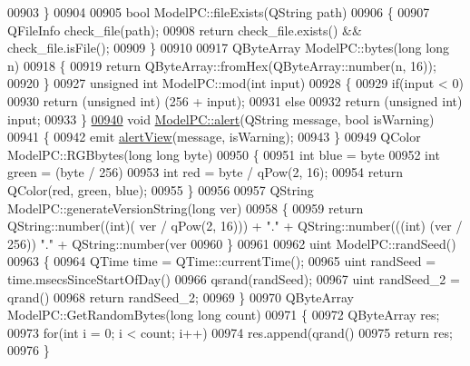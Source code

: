 \begin{DoxyCode}
{00903 \}
00904 
00905 \textcolor{keywordtype}{bool} ModelPC::fileExists(QString path)
00906 \{
00907     QFileInfo check\_file(path);
00908     \textcolor{keywordflow}{return} check\_file.exists() && check\_file.isFile();
00909 \}
00910 
00917 QByteArray ModelPC::bytes(\textcolor{keywordtype}{long} \textcolor{keywordtype}{long} n)
00918 \{
00919     \textcolor{keywordflow}{return} QByteArray::fromHex(QByteArray::number(n, 16));
00920 \}
00927 \textcolor{keywordtype}{unsigned} \textcolor{keywordtype}{int} ModelPC::mod(\textcolor{keywordtype}{int} input)
00928 \{
00929     \textcolor{keywordflow}{if}(input < 0)
00930         \textcolor{keywordflow}{return} (\textcolor{keywordtype}{unsigned} \textcolor{keywordtype}{int}) (256 + input);
00931     \textcolor{keywordflow}{else}
00932         \textcolor{keywordflow}{return} (\textcolor{keywordtype}{unsigned} \textcolor{keywordtype}{int}) input;
00933 \}
\hypertarget{modelpc_8cpp_source.tex_l00940}{}\hyperlink{class_model_p_c_a9079a101d83672aa48fd2dbac797de40}{00940} \textcolor{keywordtype}{void} \hyperlink{class_model_p_c_a9079a101d83672aa48fd2dbac797de40}{ModelPC::alert}(QString message, \textcolor{keywordtype}{bool} isWarning)
00941 \{
00942     emit \hyperlink{class_model_p_c_af0217a7ca5671e26090dc50a5dccdaf5}{alertView}(message, isWarning);
00943 \}
00949 QColor ModelPC::RGBbytes(\textcolor{keywordtype}{long} \textcolor{keywordtype}{long} byte)
00950 \{
00951     \textcolor{keywordtype}{int} blue = byte %
00952     \textcolor{keywordtype}{int} green = (byte / 256) %
00953     \textcolor{keywordtype}{int} red = byte / qPow(2, 16);
00954     \textcolor{keywordflow}{return} QColor(red, green, blue);
00955 \}
00956 
00957 QString ModelPC::generateVersionString(\textcolor{keywordtype}{long} ver)
00958 \{
00959     \textcolor{keywordflow}{return} QString::number((\textcolor{keywordtype}{int})( ver / qPow(2, 16))) + \textcolor{stringliteral}{"."} + QString::number(((\textcolor{keywordtype}{int}) (ver / 256)) %
      "."} + QString::number(ver %
00960 \}
00961 
00962 uint ModelPC::randSeed()
00963 \{
00964     QTime time = QTime::currentTime();
00965     uint randSeed = time.msecsSinceStartOfDay() %
00966     qsrand(randSeed);
00967     uint randSeed\_2 = qrand() %
00968     \textcolor{keywordflow}{return} randSeed\_2;
00969 \}
00970 QByteArray ModelPC::GetRandomBytes(\textcolor{keywordtype}{long} \textcolor{keywordtype}{long} count)
00971 \{
00972     QByteArray res;
00973     \textcolor{keywordflow}{for}(\textcolor{keywordtype}{int} i = 0; i < count; i++)
00974        res.append(qrand() %
00975     \textcolor{keywordflow}{return} res;
00976 \}
\end{DoxyCode}
